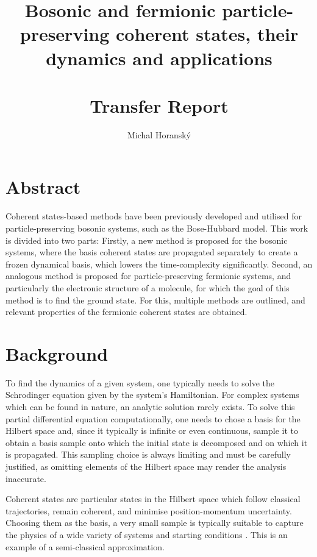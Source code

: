 \documentclass[12pt]{report}
\begin{document}
	\title{Bosonic and fermionic particle-preserving coherent states, their dynamics and applications\\\hfill\\Transfer Report}
	\author{Michal Horanský}
	\maketitle
	
	\chapter*{Abstract}
	Coherent states-based methods have been previously developed and utilised for particle-preserving bosonic systems, such as the Bose-Hubbard model. This work is divided into two parts: Firstly, a new method is proposed for the bosonic systems, where the basis coherent states are propagated separately to create a frozen dynamical basis, which lowers the time-complexity significantly. Second, an analogous method is proposed for particle-preserving fermionic systems, and particularly the electronic structure of a molecule, for which the goal of this method is to find the ground state. For this, multiple methods are outlined, and relevant properties of the fermionic coherent states are obtained.
	
	
	\tableofcontents
	
	
	\chapter{Background}
	
	To find the dynamics of a given system, one typically needs to solve the Schrodinger equation given by the system's Hamiltonian. For complex systems which can be found in nature, an analytic solution rarely exists. To solve this partial differential equation computationally, one needs to chose a basis for the Hilbert space and, since it typically is infinite or even continuous, sample it to obtain a basis sample onto which the initial state is decomposed and on which it is propagated. This sampling choice is always limiting and must be carefully justified, as omitting elements of the Hilbert space may render the analysis inaccurate.
	
	Coherent states are particular states in the Hilbert space which follow classical trajectories, remain coherent, and minimise position-momentum uncertainty. Choosing them as the basis, a very small sample is typically suitable to capture the physics of a wide variety of systems and starting conditions \cite{grossmann}. This is an example of a semi-classical approximation.
	
\end{document}

